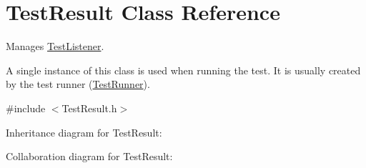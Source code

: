 \hypertarget{class_test_result}{\section{Test\+Result Class Reference}
\label{class_test_result}
}


Manages \hyperlink{class_test_listener}{Test\+Listener}.

A single instance of this class is used when running the test. It is usually created by the test runner (\hyperlink{class_test_runner}{Test\+Runner}).  




{\ttfamily \#include $<$Test\+Result.\+h$>$}



Inheritance diagram for Test\+Result\+:


Collaboration diagram for Test\+Result\+:
